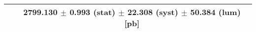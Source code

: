 \begin{tabular}{lc}
\hline
                               & 2799.130 $\pm$ 0.993 (stat) $\pm$ 22.308 (syst) $\pm$ 50.384 (lum) [pb]  \\
\hline
\end{tabular}

